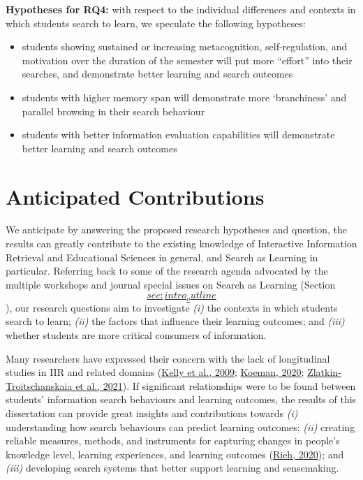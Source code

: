 \documentclass[a4paper, nobind]{templates/ociamthesis}
\begin{document}
\textbf{Hypotheses for RQ4:} with respect to the individual differences and
contexts in which students search to learn, we speculate the following
hypotheses:

\begin{itemize}
\item
  students showing sustained or increasing metacognition,
  self-regulation, and motivation over the duration of the semester
  will put more ``effort'' into their searches, and demonstrate better
  learning and search outcomes
\item
  students with higher memory span will demonstrate more `branchiness'
  and parallel browsing in their search behaviour
\item
  students with better information evaluation capabilities will
  demonstrate better learning and search outcomes
\end{itemize}

\hypertarget{sec:rq_diss_contributions}{%
\section{Anticipated Contributions}\label{sec:rq_diss_contributions}}

We anticipate by answering the proposed research hypotheses and
question, the results can greatly contribute to the existing knowledge
of Interactive Information Retrieval and Educational Sciences in
general, and Search as Learning in particular. Referring back to some of
the research agenda advocated by the multiple workshops and journal
special issues on Search as Learning (Section
\protect\hyperlink{sec:intro_outline}{\[sec:intro_outline\]}), our research questions aim to
investigate \emph{(i)} the contexts in which students search to learn; \emph{(ii)}
the factors that influence their learning outcomes; and \emph{(iii)} whether
students are more critical consumers of information.

Many researchers have expressed their concern with the lack of
longitudinal studies in IIR and related domains
(\protect\hyperlink{ref-kelly2009evaluation}{Kelly et al., 2009}; \protect\hyperlink{ref-HCIUXres81_online}{Koeman, 2020}; \protect\hyperlink{ref-zlatkin2021students}{Zlatkin-Troitschanskaia et al., 2021}). If
significant relationships were to be found between students' information
search behaviours and learning outcomes, the results of this
dissertation can provide great insights and contributions towards \emph{(i)}
understanding how search behaviours can predict learning outcomes;
\emph{(ii)} creating reliable measures, methods, and instruments for
capturing changes in people's knowledge level, learning experiences, and
learning outcomes (\protect\hyperlink{ref-url_rieh_homepage}{Rieh, 2020}); and \emph{(iii)} developing search
systems that better support learning and sensemaking.
\end{document}
